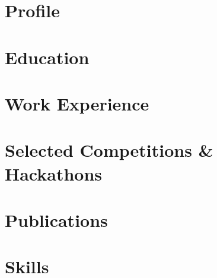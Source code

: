 \documentclass[letter,10pt]{article}
\begin{document}
\section{Profile}


\section{Education}



\section{Work Experience}


\section{Selected Competitions \& Hackathons}


\section{Publications}


\section{Skills}

\end{document}
